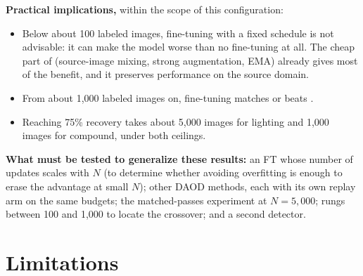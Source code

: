 \textbf{Practical implications,} within the scope of this configuration:
\begin{itemize}
\item Below about 100 labeled images, fine-tuning with a fixed schedule is not advisable: it can make the model worse than no fine-tuning at all. The cheap part of \aldi (source-image mixing, strong augmentation, EMA) already gives most of the benefit, and it preserves performance on the source domain.
\item From about 1,000 labeled images on, fine-tuning matches or beats \aldi.
\item Reaching 75\% recovery takes about 5,000 images for lighting and 1,000 images for compound, under both ceilings.
\end{itemize}

\textbf{What must be tested to generalize these results:} an FT whose number of updates scales with $N$ (to determine whether avoiding overfitting is enough to erase the advantage at small $N$); other DAOD methods, each with its own replay arm on the same budgets; the matched-passes experiment at $N = 5{,}000$; rungs between 100 and 1,000 to locate the crossover; and a second detector.

\section{Limitations}\label{sec:limitations}

